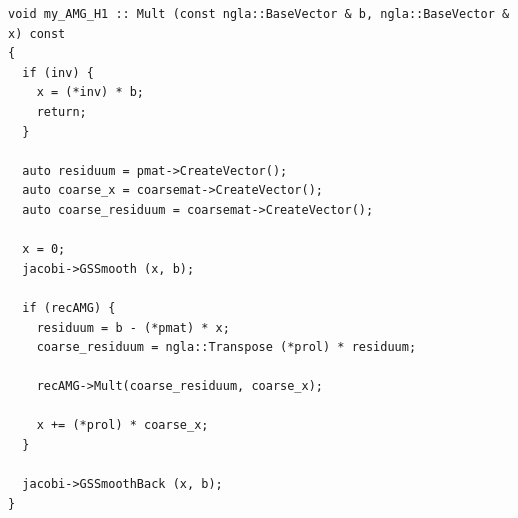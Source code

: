 \documentclass[a4paper,11pt]{scrartcl}
\begin{document}
\begin{lstlisting}
void my_AMG_H1 :: Mult (const ngla::BaseVector & b, ngla::BaseVector & x) const
{
  if (inv) {
    x = (*inv) * b;
    return;
  }

  auto residuum = pmat->CreateVector();
  auto coarse_x = coarsemat->CreateVector();
  auto coarse_residuum = coarsemat->CreateVector();

  x = 0;
  jacobi->GSSmooth (x, b);

  if (recAMG) {
    residuum = b - (*pmat) * x;
    coarse_residuum = ngla::Transpose (*prol) * residuum;

    recAMG->Mult(coarse_residuum, coarse_x);

    x += (*prol) * coarse_x;
  }

  jacobi->GSSmoothBack (x, b);
}
\end{lstlisting}

\label{lst:mult}
\begin{figure}
%

\end{figure}
\end{document}
